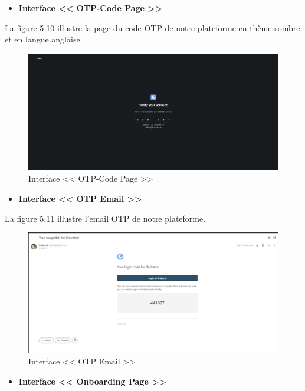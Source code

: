 \begin{itemize}
    \item \textbf{Interface << OTP-Code Page >>}
\end{itemize}
La figure 5.10 illustre la page du code OTP de notre plateforme en thème sombre et en langue anglaise.
\begin{figure}[H]
    \centering
    \includegraphics[width=1.1\textwidth,height=0.5\textwidth]{images/chp5/fig10.png}
    \caption{Interface << OTP-Code Page >>}
    \label{Interface << OTP-Code Page >>}    
\end{figure}
\begin{itemize}
    \item \textbf{Interface << OTP Email >>}
\end{itemize}
La figure 5.11 illustre l'email OTP de notre plateforme.
\begin{figure}[H]
    \centering
    \includegraphics[width=1.1\textwidth,height=0.5\textwidth]{images/chp5/fig11.png}
    \caption{Interface << OTP Email >>}
    \label{Interface << OTP Email >>}    
\end{figure} 
\begin{itemize}
    \item \textbf{Interface << Onboarding Page >>}
\end{itemize}

